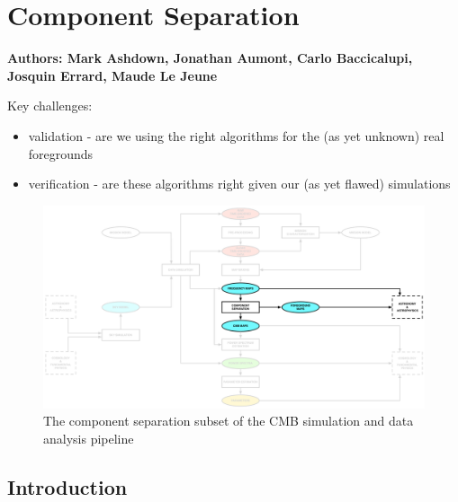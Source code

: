 
\section{Component Separation}

\textbf{ Authors: Mark Ashdown, Jonathan Aumont, Carlo Baccicalupi, Josquin Errard, Maude Le Jeune}

Key challenges:
\begin{itemize}
\item validation - are we using the right algorithms for the (as yet unknown) real foregrounds
\item verification - are these algorithms right given our (as yet flawed) simulations
\end{itemize}

\begin{figure}[htbp]
\centering
\includegraphics[width=1\textwidth]{Analysis/cs}
\caption{The component separation subset of the CMB simulation and data analysis pipeline}
\label{default}
\end{figure}


\subsection{Introduction}


